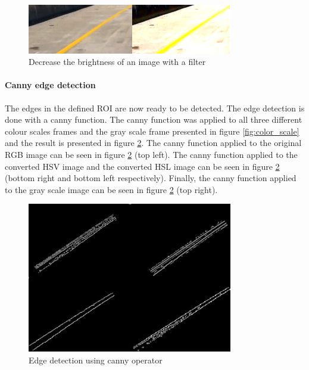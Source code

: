 \begin{figure}[H]
    \centering
    \includegraphics[width = 0.8\textwidth]{Figures/darker.png}
    \caption{Decrease the brightness of an image with a filter}
    \label{fig:darker}
\end{figure}


\paragraph{Canny edge detection}

The edges in the defined ROI are now ready to be detected. The edge detection is done with a canny function. The canny function was applied to all three different colour scales frames and the gray scale frame presented in figure \ref{fig:color_scale} and the result is presented in figure \ref{fig:canny}. The canny function applied to the original RGB image can be seen in figure \ref{fig:canny} (top left). The canny function applied to the converted HSV image and the converted HSL image can be seen in figure \ref{fig:canny} (bottom right and bottom left respectively). Finally, the canny function applied to the gray scale image can be seen in figure \ref{fig:canny} (top right).


\begin{figure}[H]
    \centering
    \includegraphics[width = 0.8\textwidth]{Figures/edge.pdf}
    \caption{Edge detection using canny operator}
    \label{fig:canny}
\end{figure}

